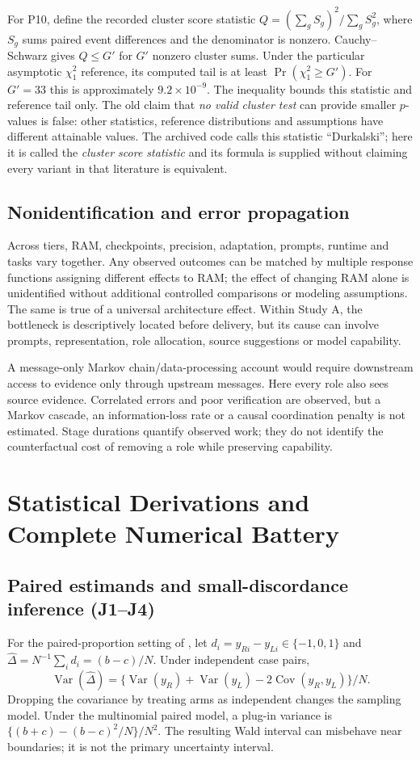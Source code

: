 For P10, define the recorded cluster score statistic $Q=(\sum_g S_g)^2/\sum_g S_g^2$, where $S_g$ sums paired event differences and the denominator is nonzero. Cauchy--Schwarz gives $Q\leq G'$ for $G'$ nonzero cluster sums. Under the particular asymptotic $\chi^2_1$ reference, its computed tail is at least $\Pr(\chi^2_1\geq G')$. For $G'=33$ this is approximately $9.2\times10^{-9}$. The inequality bounds this statistic and reference tail only. The old claim that \emph{no valid cluster test} can provide smaller $p$-values is false: other statistics, reference distributions and assumptions have different attainable values. The archived code calls this statistic ``Durkalski''; here it is called the \emph{cluster score statistic} and its formula is supplied without claiming every variant in that literature is equivalent.

\subsection{Nonidentification and error propagation}
Across tiers, RAM, checkpoints, precision, adaptation, prompts, runtime and tasks vary together. Any observed outcomes can be matched by multiple response functions assigning different effects to RAM; the effect of changing RAM alone is unidentified without additional controlled comparisons or modeling assumptions. The same is true of a universal architecture effect. Within Study A, the bottleneck is descriptively located before delivery, but its cause can involve prompts, representation, role allocation, source suggestions or model capability.

A message-only Markov chain/data-processing account would require downstream access to evidence only through upstream messages. Here every role also sees source evidence. Correlated errors and poor verification are observed, but a Markov cascade, an information-loss rate or a causal coordination penalty is not estimated. Stage durations quantify observed work; they do not identify the counterfactual cost of removing a role while preserving capability.

\section{Statistical Derivations and Complete Numerical Battery}\label{sec:statistics-restored}
\subsection{Paired estimands and small-discordance inference (J1--J4)}
For the paired-proportion setting of \citet{mcnemar}, let $d_i=y_{Ri}-y_{Li}\in\{-1,0,1\}$ and $\widehat\Delta=N^{-1}\sum_i d_i=(b-c)/N$. Under independent case pairs,
\begin{equation}
 \operatorname{Var}(\widehat\Delta)=\{\operatorname{Var}(y_R)+\operatorname{Var}(y_L)-2\operatorname{Cov}(y_R,y_L)\}/N.
\end{equation}
Dropping the covariance by treating arms as independent changes the sampling model. Under the multinomial paired model, a plug-in variance is $\{(b+c)-(b-c)^2/N\}/N^2$. The resulting Wald interval can misbehave near boundaries; it is not the primary uncertainty interval.

